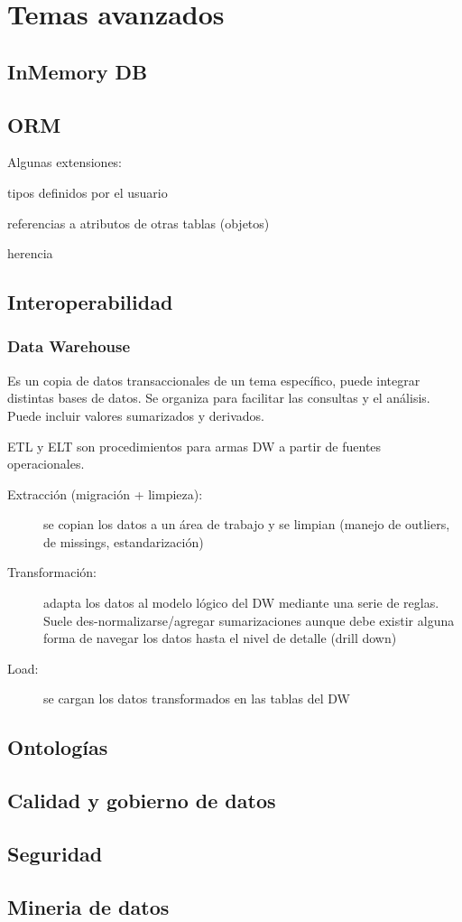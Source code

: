\chapter{Temas avanzados}

\section{InMemory DB}

\section{ORM}

Algunas extensiones:

tipos definidos por el usuario

referencias a atributos de otras tablas (objetos)

herencia

\section{Interoperabilidad}

\subsection{Data Warehouse}

Es un copia de datos transaccionales de un tema específico, puede integrar distintas bases de datos. Se organiza para facilitar las consultas y el análisis. Puede incluir valores sumarizados y derivados.

ETL y ELT son procedimientos para armas DW a partir de fuentes operacionales.

\begin{description}
	\item[Extracción (migración + limpieza):] se copian los datos a un área de trabajo y se limpian (manejo de outliers, de missings, estandarización)
	\item[Transformación:] adapta los datos al modelo lógico del DW mediante una serie de reglas. Suele des-normalizarse/agregar sumarizaciones aunque debe existir alguna forma de navegar los datos hasta el nivel de detalle (drill down)
	\item[Load:] se cargan los datos transformados en las tablas del DW
\end{description}

\section{Ontologías}

\section{Calidad y gobierno de datos}

\section{Seguridad}

\section{Mineria de datos}
